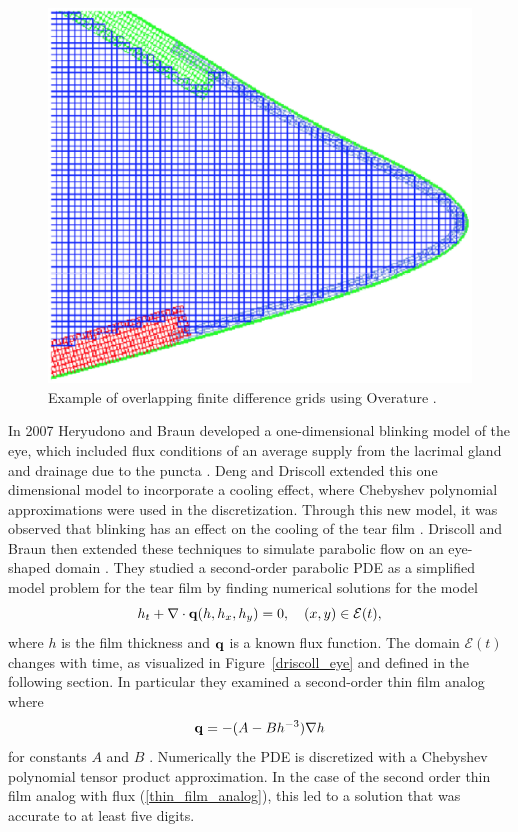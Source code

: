\begin{figure}
	\centering
	\includegraphics[scale=0.6]{Chapter4/overature_eye}
	\caption{Example of overlapping finite difference grids using Overature \cite{maki2010tear}. }
	\label{overature_eye}
\end{figure}


In 2007 Heryudono and Braun developed a one-dimensional blinking model of the eye, which included flux conditions of an average supply from the lacrimal gland and drainage due to the puncta \cite{heryudono2007single}. Deng and Driscoll extended this one dimensional model to incorporate a cooling effect, where Chebyshev polynomial approximations were used in the discretization. Through this new model, it was observed that blinking has an effect on the cooling of the tear film \cite{deng2013model,deng2014heat}. Driscoll and Braun then extended these techniques to simulate parabolic flow on an eye-shaped domain \cite{driscoll2018simulation}. They studied a second-order parabolic PDE as a simplified model problem for the tear film by finding numerical solutions for the model
\begin{equation}
\label{driscollPDE}
h_t + \nabla \cdot \mathbf{q} (h,h_x,h_y)=0, \quad (x,y) \in \mathcal{E}(t),
\end{equation}
where $h$ is the film thickness and $\mathbf{q}$ is a known flux function. The domain $\mathcal{E}(t)$ changes with time, as visualized in Figure~\ref{driscoll_eye} and defined in the following section. In particular they examined a second-order thin film analog where
\begin{equation}
\label{thin_film_analog}
\mathbf{q} = -(A-B h^{-3})\nabla h
\end{equation}
for constants $A$ and $B$ \cite{driscoll2018simulation}. Numerically the PDE is discretized with a Chebyshev polynomial tensor product approximation. In the case of the second order thin film analog with flux (\ref{thin_film_analog}), this led to a solution that was accurate to at least five digits.

